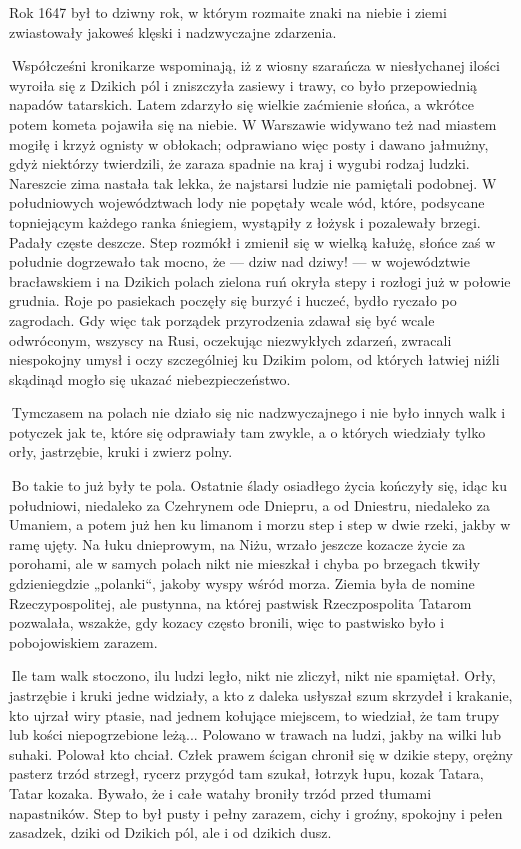 Rok 1647 był to dziwny rok, w którym rozmaite znaki na niebie i ziemi zwiastowały jakoweś klęski i nadzwyczajne zdarzenia.

 Współcześni kronikarze wspominają, iż z wiosny szarańcza w niesłychanej ilości wyroiła się z Dzikich pól i zniszczyła zasiewy i trawy, co było przepowiednią napadów tatarskich. Latem zdarzyło się wielkie zaćmienie słońca, a wkrótce potem kometa pojawiła się na niebie. W Warszawie widywano też nad miastem mogiłę i krzyż ognisty w obłokach; odprawiano więc posty i dawano jałmużny, gdyż niektórzy twierdzili, że zaraza spadnie na kraj i wygubi rodzaj ludzki. Nareszcie zima nastała tak lekka, że najstarsi ludzie nie pamiętali podobnej. W południowych województwach lody nie popętały wcale wód, które, podsycane topniejącym każdego ranka śniegiem, wystąpiły z łożysk i pozalewały brzegi. Padały częste deszcze. Step rozmókł i zmienił się w wielką kałużę, słońce zaś w południe dogrzewało tak mocno, że — dziw nad dziwy! — w województwie bracławskiem i na Dzikich polach zielona ruń okryła stepy i rozłogi już w połowie grudnia. Roje po pasiekach poczęły się burzyć i huczeć, bydło ryczało po zagrodach. Gdy więc tak porządek przyrodzenia zdawał się być wcale odwróconym, wszyscy na Rusi, oczekując niezwykłych zdarzeń, zwracali niespokojny umysł i oczy szczególniej ku Dzikim polom, od których łatwiej niźli skądinąd mogło się ukazać niebezpieczeństwo.

 Tymczasem na polach nie działo się nic nadzwyczajnego i nie było innych walk i potyczek jak te, które się odprawiały tam zwykle, a o których wiedziały tylko orły, jastrzębie, kruki i zwierz polny.

 Bo takie to już były te pola. Ostatnie ślady osiadłego życia kończyły się, idąc ku południowi, niedaleko za Czehrynem ode Dniepru, a od Dniestru, niedaleko za Umaniem, a potem już hen ku limanom i morzu step i step w dwie rzeki, jakby w ramę ujęty. Na łuku dnieprowym, na Niżu, wrzało jeszcze kozacze życie za porohami, ale w samych polach nikt nie mieszkał i chyba po brzegach tkwiły gdzieniegdzie „polanki“, jakoby wyspy wśród morza. Ziemia była de nomine Rzeczypospolitej, ale pustynna, na której pastwisk Rzeczpospolita Tatarom pozwalała, wszakże, gdy kozacy często bronili, więc to pastwisko było i pobojowiskiem zarazem.

 Ile tam walk stoczono, ilu ludzi legło, nikt nie zliczył, nikt nie spamiętał. Orły, jastrzębie i kruki jedne widziały, a kto z daleka usłyszał szum skrzydeł i krakanie, kto ujrzał wiry ptasie, nad jednem kołujące miejscem, to wiedział, że tam trupy lub kości niepogrzebione leżą... Polowano w trawach na ludzi, jakby na wilki lub suhaki. Polował kto chciał. Człek prawem ścigan chronił się w dzikie stepy, orężny pasterz trzód strzegł, rycerz przygód tam szukał, łotrzyk łupu, kozak Tatara, Tatar kozaka. Bywało, że i całe watahy broniły trzód przed tłumami napastników. Step to był pusty i pełny zarazem, cichy i groźny, spokojny i pełen zasadzek, dziki od Dzikich pól, ale i od dzikich dusz.

